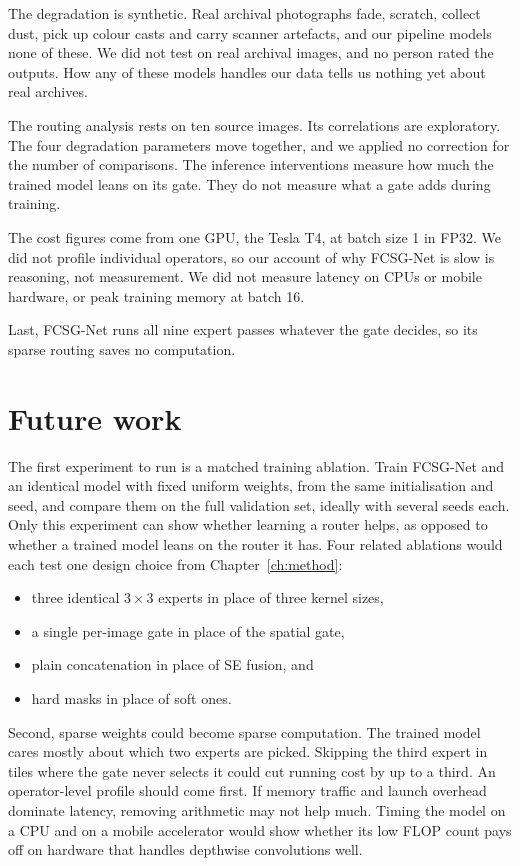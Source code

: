 \documentclass[12pt,a4paper,oneside]{NITR}
\newcommand{\fcsg}{FCSG-Net}
\begin{document}
The degradation is synthetic. Real archival photographs fade, scratch,
collect dust, pick up colour casts and carry scanner artefacts, and our
pipeline models none of these. We did not test on real archival images, and
no person rated the outputs. How any of these models handles our data tells
us nothing yet about real archives.

The routing analysis rests on ten source images. Its correlations are
exploratory. The four degradation parameters move together, and we applied
no correction for the number of comparisons. The inference interventions
measure how much the trained model leans on its gate. They do not measure
what a gate adds during training.

The cost figures come from one GPU, the Tesla T4, at batch size 1 in FP32.
We did not profile individual operators, so our account of why \fcsg{} is
slow is reasoning, not measurement. We did not measure latency on CPUs or
mobile hardware, or peak training memory at batch 16.

Last, \fcsg{} runs all nine expert passes whatever the gate decides, so its
sparse routing saves no computation.

\section{Future work}\label{sec:future}

The first experiment to run is a matched training ablation. Train \fcsg{} and
an identical model with fixed uniform weights, from the same initialisation
and seed, and compare them on the full validation set, ideally with several
seeds each. Only this experiment can show whether learning a router helps, as
opposed to whether a trained model leans on the router it has. Four related
ablations would each test one design choice from Chapter~\ref{ch:method}:
\begin{itemize}
	\item three identical $3\times3$ experts in place of three kernel sizes,
	\item a single per-image gate in place of the spatial gate,
	\item plain concatenation in place of SE fusion, and
	\item hard masks in place of soft ones.
\end{itemize}

Second, sparse weights could become sparse computation. The trained model
cares mostly about which two experts are picked. Skipping the third expert in
tiles where the gate never selects it could cut running cost by up to a
third. An operator-level profile should come first. If memory traffic and
launch overhead dominate latency, removing arithmetic may not help much. Timing
the model on a CPU and on a mobile accelerator would show whether its low
FLOP count pays off on hardware that handles depthwise convolutions well.
\end{document}
